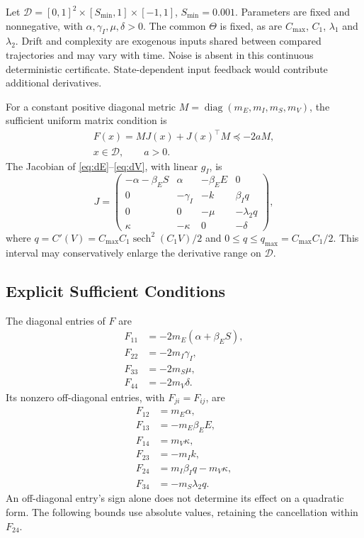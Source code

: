 \documentclass[11pt,twocolumn]{article}
\begin{document}
Let $\mathcal D=[0,1]^2\times[S_{\min},1]\times[-1,1]$,
$S_{\min}=0.001$. Parameters are fixed and nonnegative, with
$\alpha,\gamma_I,\mu,\delta>0$. The common $\Theta$ is fixed,
as are $C_{\max}$, $C_1$, $\lambda_1$ and $\lambda_2$. Drift
and complexity are exogenous inputs shared between compared
trajectories and may vary with time. Noise is absent in this
continuous deterministic certificate. State-dependent input
feedback would contribute additional derivatives.

For a constant positive diagonal metric
$M=\operatorname{diag}(m_E,m_I,m_S,m_V)$, the sufficient uniform
matrix condition is
\begin{equation}
 \begin{gathered}
 F(x)=MJ(x)+J(x)^\top M\preceq-2aM,\\
 x\in\mathcal D,\qquad a>0.
 \end{gathered}
 \label{eq:contraction-condition}
\end{equation}
The Jacobian of \eqref{eq:dE}--\eqref{eq:dV}, with linear $g_I$,
is
\begin{equation}
J=\begin{pmatrix}
 -\alpha-\beta_E S&\alpha&-\beta_E E&0\\
 0&-\gamma_I&-k&\beta_I q\\
 0&0&-\mu&-\lambda_2 q\\
 \kappa&-\kappa&0&-\delta
\end{pmatrix},
\label{eq:jacobian}
\end{equation}
where $q=C'(V)=C_{\max}C_1\operatorname{sech}^2(C_1V)/2$
and $0\le q\le q_{\max}=C_{\max}C_1/2$. This interval may
conservatively enlarge the derivative range on $\mathcal D$.

\subsection*{Explicit Sufficient Conditions}

The diagonal entries of $F$ are
\begin{align}
 F_{11}&=-2m_E(\alpha+\beta_E S),\label{eq:F11}\\
 F_{22}&=-2m_I\gamma_I,\label{eq:F22}\\
 F_{33}&=-2m_S\mu,\label{eq:F33}\\
 F_{44}&=-2m_V\delta.\label{eq:F44}
\end{align}
Its nonzero off-diagonal entries, with $F_{ji}=F_{ij}$, are
\begin{align}
 F_{12}&=m_E\alpha,\label{eq:F12}\\
 F_{13}&=-m_E\beta_E E,\label{eq:F13}\\
 F_{14}&=m_V\kappa,\label{eq:F14}\\
 F_{23}&=-m_I k,\label{eq:F23}\\
 F_{24}&=m_I\beta_Iq-m_V\kappa,\label{eq:F24}\\
 F_{34}&=-m_S\lambda_2q.\label{eq:F34}
\end{align}
An off-diagonal entry's sign alone does not determine its effect
on a quadratic form. The following bounds use absolute values,
retaining the cancellation within $F_{24}$.
\end{document}
